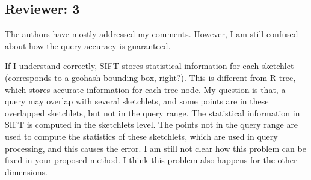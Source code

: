 \documentclass{article}
\begin{document}
\subsection*{Reviewer: 3}\label{reviewer-3}

The authors have mostly addressed my comments. However, I am still confused about how the query accuracy is guaranteed.

If I understand correctly, SIFT stores statistical information for each sketchlet (corresponds to a geohash bounding box, right?). This is different from R-tree, which stores accurate information for each tree node. My question is that, a query may overlap with several sketchlets, and some points are in these overlapped sketchlets, but not in the query range. The statistical information in SIFT is computed in the sketchlets level. The points not in the query range are used to compute the statistics of these sketchlets, which are used in query processing, and this causes the error. I am still not clear how this problem can be fixed in your proposed method. I think this problem also happens for the other dimensions.

\begin{tcolorbox}

\end{tcolorbox}
\end{document}
